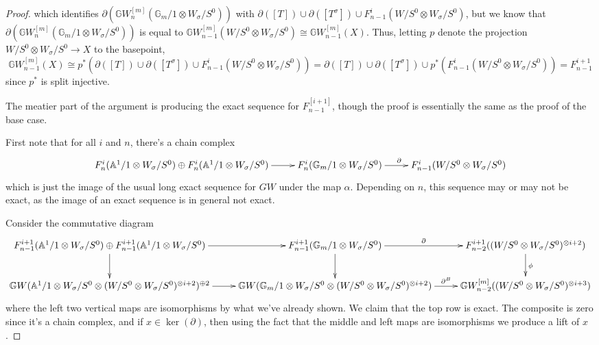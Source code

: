 \documentclass[edeposit,fullpage]{uiucthesis2009}
\newcommand{\mbb}{\mathbb}
\theoremstyle{plain}
\numberwithin{lemma}{section}
\theoremstyle{definition}
\begin{document}
\begin{proof}
which identifies $\partial(\mbb GW^{[m]}_n(\mbb G_m/1
  \otimes W_\sigma/S^0))$ with $\partial([T]) \cup \partial([T^\sigma])
\cup  F^{i}_{n-1}(W/S^0 \otimes W_\sigma/S^0)$, but we know that
  $\partial(\mbb GW^{[m]}_n(\mbb G_m/1
  \otimes W_\sigma/S^0))$ is equal to $\mbb
GW^{[m]}_{n-1}(W/S^0 \otimes W_\sigma/S^0) \cong \mbb
GW^{[m]}_{n-1}(X)$. Thus, letting $p$ denote the projection $W/S^0
\otimes W_\sigma/S^0 \rightarrow X$ to the basepoint, 
\[
\mbb GW^{[m]}_{n-1}(X) \cong p^*(\partial([T]) \cup \partial([T^\sigma])
\cup  F^{i}_{n-1}(W/S^0 \otimes W_\sigma/S^0)) = \partial([T]) \cup \partial([T^\sigma])
\cup  p^*(F^{i}_{n-1}(W/S^0 \otimes W_\sigma/S^0))  = F^{i+1}_{n-1}
\]
since $p^*$ is split injective.

The meatier part of the argument is producing the exact sequence for
$F^{[i+1]}_{n-1}$, though the proof is essentially the same as the
proof of the base case. 

First note that for all $i$ and $n$, there's a chain complex
\[
\xymatrix{F^i_n(\mbb A^1/1 \otimes W_\sigma/S^0)  \oplus F^i_n(\mbb
  A^1/1 \otimes W_\sigma/S^0)  \ar[r] & F^i_n(\mbb G_m/1 \otimes W_\sigma/S^0) \ar[r]^{\partial} &
  F^{i}_{n-1}(W/S^0 \otimes W_\sigma/S^0) }
\]
which is just the image of the usual long exact sequence for $GW$
under the map $\alpha$. Depending on $n$, this sequence
may or may not be exact, as the image of an exact sequence is in
general not exact. 

Consider the commutative diagram
\small
\[
\xymatrix{F^{i+1}_{n-1}(\mbb A^1/1 \otimes W_\sigma/S^0)  \oplus F^{i+1}_{n-1}(\mbb
  A^1/1 \otimes W_\sigma/S^0)  \ar[r] \ar[d]& F^{i+1}_{n-1}(\mbb G_m/1
  \otimes W_\sigma/S^0) \ar[r]^-{\partial} \ar[d]& \ar[d]^{\phi}
  F^{i+1}_{n-2}((W/S^0 \otimes W_\sigma/S^0)^{\otimes i+2}) \\
\mbb GW(\mbb A^1/1 \otimes W_\sigma/S^0 \otimes (W/S^0 \otimes
W_\sigma/S^0)^{\otimes i+2})^{\oplus 2} \ar[r] & \mbb
GW(\mbb G_m/1 \otimes W_\sigma/S^0 \otimes (W/S^0 \otimes W_\sigma/S^0)^{\otimes i+2}) \ar[r]^-{\partial^B} &
 \mbb GW^{[m]}_{n-2}((W/S^0 \otimes W_\sigma/S^0)^{\otimes i+3}) }
\]
\normalsize
where the left two vertical maps are isomorphisms by what we've
already shown. We claim that the top row is exact. The composite is
zero since it's a chain complex, and if $x \in \ker(\partial)$, then
using the fact that the middle and left maps are isomorphisms we
produce a lift of $x$. 



\end{proof}
\end{document}
